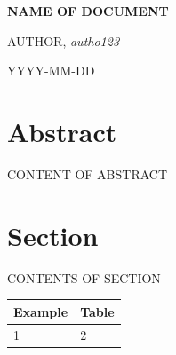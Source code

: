 \documentclass[11pt]{article}
\date{} %
\begin{document}
	\begin{titlepage}
		\begin{center}
			
			{\Large\bfseries NAME OF DOCUMENT} \\ %
			
			\vspace{2\baselineskip}
			
			AUTHOR, \textit{autho123} \\ %
			
			\vspace{2\baselineskip}
			
			YYYY-MM-DD	%
			
		\end{center}
	\end{titlepage}
	
	\setcounter{secnumdepth}{0} %
	\section*{Abstract}
	
	CONTENT OF ABSTRACT 
	\pagebreak
	
	\setcounter{secnumdepth}{2} %
	
	\tableofcontents	%
	
	\pagebreak
	
	
	
	\section{Section} 	%
	
	CONTENTS OF SECTION
	
	\begin{table}[h]
		\begin{tabular}{|l|l|} \hline
			
			Example&
			Table \\ \hline
			
			1&
			2 \\ \hline
			
		\end{tabular}
	\end{table}
	
\end{document}
